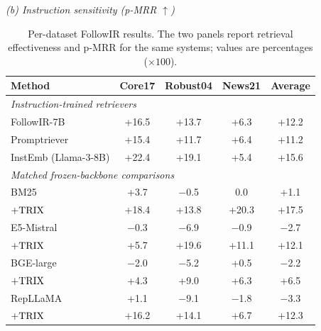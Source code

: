 \documentclass[letterpaper]{article}
\newcommand{\method}{\ifmmode \mathrm{TRIX}\else TRIX\xspace\fi}
\begin{document}
\begin{table}[htbp]
\smallskip
\textit{(b) Instruction sensitivity (p-MRR $\uparrow$)}\par\smallskip
\begin{tabular}{lcccc}
\toprule
\textbf{Method} & \textbf{Core17} & \textbf{Robust04} &
\textbf{News21} & \textbf{Average} \\
\midrule
\multicolumn{5}{l}{\emph{Instruction-trained retrievers}} \\
FollowIR-7B & +16.5 & +13.7 & +6.3 & +12.2 \\
Promptriever & +15.4 & +11.7 & +6.4 & +11.2 \\
InstEmb (Llama-3-8B) & +22.4 & +19.1 & +5.4 & +15.6 \\
\midrule
\multicolumn{5}{l}{\emph{Matched frozen-backbone comparisons}} \\
BM25 & +3.7 & $-$0.5 & 0.0 & +1.1 \\
\quad $+\method$ & +18.4 & +13.8 & +20.3 & +17.5 \\
E5-Mistral & $-$0.3 & $-$6.9 & $-$0.9 & $-$2.7 \\
\quad $+\method$ & +5.7 & +19.6 & +11.1 & +12.1 \\
BGE-large & $-$2.0 & $-$5.2 & +0.5 & $-$2.2 \\
\quad $+\method$ & +4.3 & +9.0 & +6.3 & +6.5 \\
RepLLaMA & +1.1 & $-$9.1 & $-$1.8 & $-$3.3 \\
\quad $+\method$ & +16.2 & +14.1 & +6.7 & +12.3 \\
\bottomrule
\end{tabular}
\caption{Per-dataset FollowIR results.  The two panels report retrieval
effectiveness and p-MRR for the same systems; values are percentages
($\times100$).}
\label{tab:followir-breakdown}
\end{table}
\end{document}
